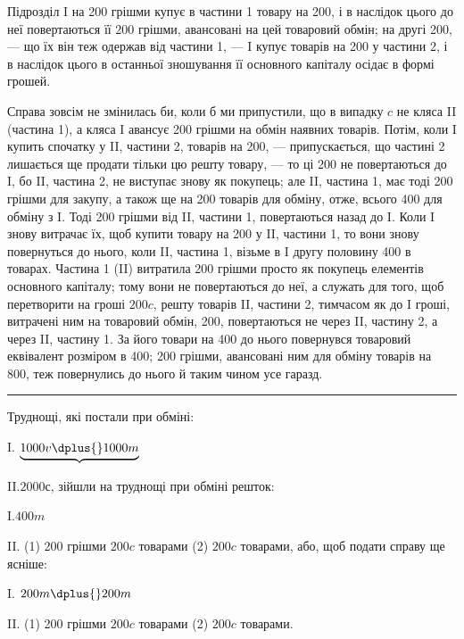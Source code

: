 
Підрозділ I на 200 грішми купує в частини 1 товару на
200, і в наслідок цього до неї повертаються її 200 грішми,
авансовані на цей товаровий обмін; на другі 200, — що їх він
теж одержав від частини 1, — I купує товарів на 200 у частини 2, і в
наслідок цього в останньої зношування її основного капіталу осідає в
формі грошей.

Справа зовсім не змінилась би, коли б ми припустили, що в випадку
$c$ не кляса II (частина 1), а кляса I авансує 200 грішми на обмін наявних
товарів. Потім, коли I купить спочатку у II, частини 2, товарів на
200, — припускається, що частині 2 лишається ще продати тільки цю
решту товару, — то ці 200 не повертаються до I, бо II, частина
2, не виступає знову як покупець; але II, частина 1, має тоді 200
грішми для закупу, а також ще на 200 товарів для обміну, отже, всього
400 для обміну з I. Тоді 200 грішми від II, частини 1, повертаються
назад до I. Коли I знову витрачає їх, щоб купити товару на
200 у II, частини 1, то вони знову повернуться до нього, коли II,
частина 1, візьме в I другу половину 400 в товарах. Частина 1 (II)
витратила 200 грішми просто як покупець елементів основного
капіталу; тому вони не повертаються до неї, а служать для того,
щоб перетворити на гроші $200 c$, решту товарів II, частини 2, тимчасом
як до I гроші, витрачені ним на товаровий обмін, 200, повертаються
не через II, частину 2, а через II, частину 1. За його товари
на 400 до нього повернувся товаровий еквівалент розміром в 400;
200 грішми, авансовані ним для обміну товарів на 800, теж
повернулись до нього й таким чином усе гаразд.

\pfbreak

Труднощі, які постали при обміні:

I. $\underbrace{1000 v \dplus{} 1000 m}^{}$

II.\makebox[20pt]{}$2000 с$, зійшли на труднощі при обміні решток:

I.\makebox[25pt]{\dotfill{}}$400 m$

II. (1) 200 грішми \dplus{} $200 c$ товарами \dplus{} (2) $200 c$ товарами, або, щоб
подати справу ще ясніше:

I.  $200 m \dplus{} 200 m$

II. (1) 200 грішми \dplus{} $200 c$ товарами \dplus{} (2) $200 c$ товарами.

